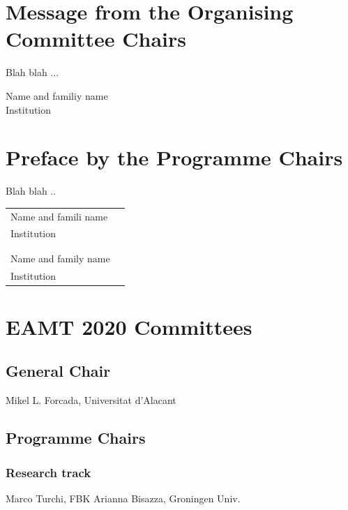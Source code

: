 \documentclass[a4paper,11pt,twoside]{book}
\begin{document}
\chapter*{Message from the Organising Committee Chairs}
Blah blah ...

\begin{center}
Name and familiy name\\
\noindent Institution
\end{center}


\chapter*{Preface by the Programme Chairs}

Blah blah ..

\vspace{1cm}
\begin{center}
\begin{tabular}{ll}
Name and famili name\\
Institution\\
\\
\\
Name and family name\\
Institution\\
\end{tabular}

\end{center}

\chapter*{EAMT 2020 Committees}

\section*{General Chair}
\noindent Mikel L. Forcada, Universitat d’Alacant


\section*{Programme Chairs}
\subsection*{Research track}
\noindent Marco Turchi, FBK
\noindent Arianna Bisazza, Groningen Univ.
\end{document}
